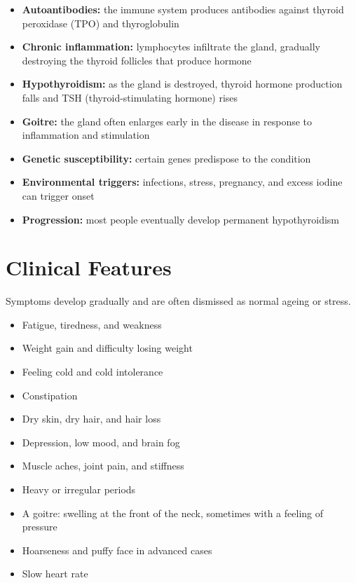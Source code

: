 \begin{itemize}
    \item \textbf{Autoantibodies:} the immune system produces antibodies against thyroid peroxidase (TPO) and thyroglobulin
    \item \textbf{Chronic inflammation:} lymphocytes infiltrate the gland, gradually destroying the thyroid follicles that produce hormone
    \item \textbf{Hypothyroidism:} as the gland is destroyed, thyroid hormone production falls and TSH (thyroid-stimulating hormone) rises
    \item \textbf{Goitre:} the gland often enlarges early in the disease in response to inflammation and stimulation
    \item \textbf{Genetic susceptibility:} certain genes predispose to the condition
    \item \textbf{Environmental triggers:} infections, stress, pregnancy, and excess iodine can trigger onset
    \item \textbf{Progression:} most people eventually develop permanent hypothyroidism
\end{itemize}

\section*{Clinical Features}
Symptoms develop gradually and are often dismissed as normal ageing or stress.

\begin{itemize}
    \item Fatigue, tiredness, and weakness
    \item Weight gain and difficulty losing weight
    \item Feeling cold and cold intolerance
    \item Constipation
    \item Dry skin, dry hair, and hair loss
    \item Depression, low mood, and brain fog
    \item Muscle aches, joint pain, and stiffness
    \item Heavy or irregular periods
    \item A goitre: swelling at the front of the neck, sometimes with a feeling of pressure
    \item Hoarseness and puffy face in advanced cases
    \item Slow heart rate
\end{itemize}

